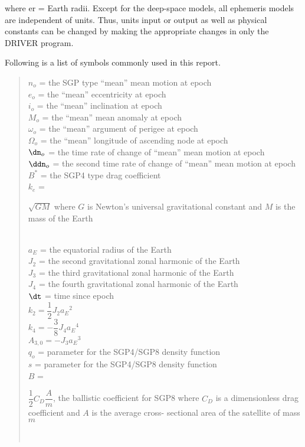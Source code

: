 \noindent
where er = Earth radii.  Except for the deep-space models, all ephemeris
models are independent of units.  Thus, units input or output as well as
physical constants can be changed by making the appropriate changes in only
the DRIVER program.

Following is a list of symbols commonly used in this report.

\begin{quote}
$n_o$ = the SGP type ``mean'' mean motion at epoch \\[12pt]
$e_o$ = the ``mean'' eccentricity at epoch \\[12pt]
$i_o$ = the ``mean'' inclination at epoch \\[12pt]
$M_o$ = the ``mean'' mean anomaly at epoch \\[12pt]
$\omega_o$ = the ``mean'' argument of perigee at epoch \\[12pt]
$\Omega_o$ = the ``mean'' longitude of ascending node at epoch \\[12pt]
$\dn_o$ = the time rate of change of ``mean'' mean motion at epoch \\[12pt]
$\ddn_o$ = the second time rate of change of ``mean'' mean motion at epoch \\[12pt]
$B^*$ = the SGP4 type drag coefficient \\[12pt]
$k_e$ = \parbox[t]{5.25in}{$\sqrt{GM}$ where $G$ is Newton's universal
gravitational constant and $M$ is the mass of the Earth} \\[12pt]
$a_E$ = the equatorial radius of the Earth \\[12pt]
$J_2$ = the second gravitational zonal harmonic of the Earth \\[12pt]
$J_3$ = the third gravitational zonal harmonic of the Earth \\[12pt]
$J_4$ = the fourth gravitational zonal harmonic of the Earth \\[12pt]
$\dt$ = time since epoch \\[12pt]
$k_2 = \dfrac12J_2a_E{}^2$ \\[12pt]
$k_4 = -\dfrac38J_4a_E{}^4$ \\[12pt]
$A_{3,0} = -J_3a_E{}^3$ \\[12pt]
$q_o$ = parameter for the SGP4/SGP8 density function \\[12pt]
$s$ = parameter for the SGP4/SGP8 density function \\[12pt]
$B$ = \parbox[t]{5.25in}{$\dfrac12C_D\dfrac Am$, the ballistic coefficient for SGP8
where $C_D$ is a dimensionless drag coefficient and $A$ is the average cross-%
sectional area of the satellite of mass $m$} \\[12pt]
\end{quote}
\newpage
